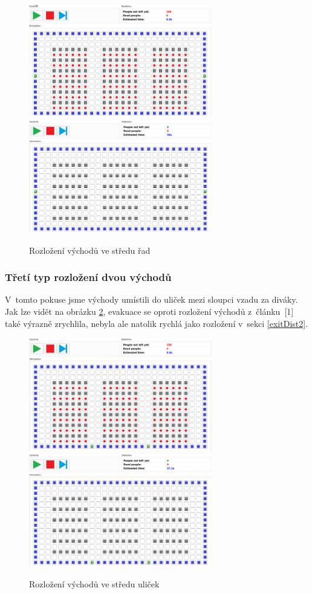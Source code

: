 \documentclass[11pt, titlepage, a4paper]{article}
\begin{document}
        \begin{figure}[H]
            \includegraphics[width=8cm]{ExitDistribution/ExitDistribTwo}
            \includegraphics[width=8cm]{ExitDistribution/ExitDistribTwoEnd}
            \caption{Rozložení východů ve středu řad}
            \label{testExits2}
        \end{figure}
        
        \subsubsection{Třetí typ rozložení dvou východů}
        V~tomto pokuse jsme východy umístili do uliček mezi sloupci vzadu za diváky. Jak lze vidět na obrázku \ref{testExits3}, evakuace se oproti rozložení východů z~článku~[1] také výrazně zrychlila, nebyla ale natolik rychlá jako rozložení v~sekci \ref{exitDist2}.
        
        \begin{figure}[H]
            \includegraphics[width=8cm]{ExitDistribution/ExitDistribThree}
            \includegraphics[width=8cm]{ExitDistribution/ExitDistribThreeEnd}
            \caption{Rozložení východů ve středu uliček}
            \label{testExits3}
        \end{figure}
        
\end{document}
